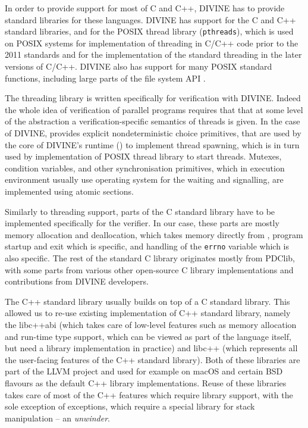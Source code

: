 In order to provide support for most of C and C++, DIVINE has to provide standard libraries for these languages.
DIVINE has support for the C and C++ standard libraries, and for the POSIX
thread library (\texttt{pthreads}), which is used on POSIX systems for
implementation of threading in C/C++ code prior to the 2011 standards and for
the implementation of the standard threading in the later versions of C/C++.
DIVINE also has support for many POSIX standard functions, including large parts of the file system API .

The threading library is written specifically for verification with DIVINE.
Indeed the whole idea of verification of parallel programs requires that that at some level of the abstraction a verification-specific semantics of threads is given.
In the case of DIVINE, \divm provides explicit nondeterministic choice primitives, that are used by the core of DIVINE's runtime (\dios) to implement thread spawning, which is in turn used by implementation of POSIX thread library to start threads.
Mutexes, condition variables, and other synchronisation primitives, which in
execution environment usually use operating system for the waiting and
signalling, are implemented using atomic sections.

Similarly to threading support, parts of the C standard library have to be
implemented specifically for the verifier.
In our case, these parts are mostly memory allocation and deallocation, which
takes memory directly from \divm, program startup and exit which is \dios specific, and handling of the \texttt{errno} variable which is also \dios specific.
The rest of the standard C library originates mostly from PDClib, with some parts from various other open-source C library implementations and contributions from DIVINE developers.

The C++ standard library usually builds on top of a C standard library.
This allowed us to re-use existing implementation of C++ standard library,
namely the libc++abi (which takes care of low-level features such as
memory allocation and run-time type support, which can be viewed as part of the
language itself, but need a library implementation in practice) and
libc++ (which represents all the user-facing features of the C++
standard library).
Both of these libraries are part of the LLVM project and used for example on
macOS and certain BSD flavours as the default C++ library implementations.
Reuse of these libraries takes care of most of the C++ features which require
library support, with the sole exception of exceptions, which require a special
library for stack manipulation -- an \emph{unwinder}.

